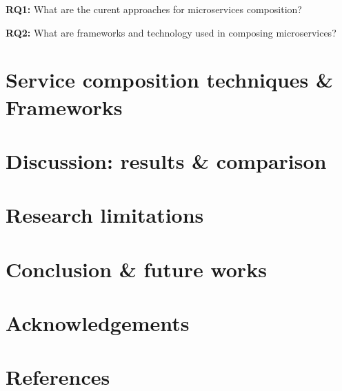 \documentclass{article}
\begin{document}
\textbf{RQ1:} What are the curent approaches for microservices composition?

\textbf{RQ2:} What are frameworks and technology used in composing microservices?


\section{Service composition techniques \& Frameworks}

\section{Discussion: results \& comparison}

\section{Research limitations}

\section{Conclusion \& future works}

\section{Acknowledgements}

\pagebreak 
\section{References}
\end{document}
